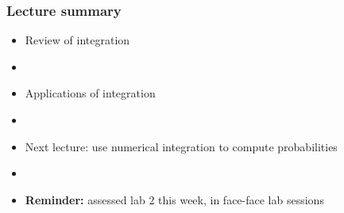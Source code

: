 \documentclass[english,14pt]{beamer}
\begin{document}
\begin{frame}[fragile]

\frametitle{Lecture summary}
\begin{itemize}
	\item Review of integration
	\item[]
	
	\item Applications of integration
	\item[]
	
	\item Next lecture: use numerical integration to compute probabilities
	
	\item[]
	
	\item \textbf{Reminder:} assessed lab 2 this week, in face-face lab sessions
\end{itemize}

\end{frame}
\end{document}
